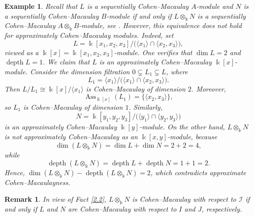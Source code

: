 \documentclass[10pt,a4paper]{amsart}
\numberwithin{equation}{theorem}
\theoremstyle{definition}
\theoremstyle{fact}
\newtheorem{example}[theorem]{Example}
\newtheorem{remark}[theorem]{Remark}
\theoremstyle{conjecture}
\newcommand{\Ass}{\operatorname{Ass}}
\newcommand{\depth}{\operatorname{depth}}
\begin{document}
\begin{example}
\label{4.5}
{\em
Recall that $L$ is a sequentially Cohen--Macaulay $A$-module and $N$ is a sequentially Cohen--Macaulay $B$-module
if and only if $L \otimes_\Bbbk N$ is a sequentially Cohen--Macaulay $A\otimes_\Bbbk B$-module, see \cite[Theorem 4.6]{R4}.
However, this equivalence does not hold for approximately Cohen--Macaulay modules.
Indeed, set
\[
L=\Bbbk[x_1, x_2, x_3]/\big(\langle x_1 \rangle \cap \langle x_2, x_3 \rangle\big),
\]
viewed as a $\Bbbk[x]=\Bbbk[x_1, x_2, x_3]$-module.
One verifies that $\dim L = 2$ and $\depth L = 1$.
We claim that $L$ is an approximately Cohen--Macaulay $\Bbbk[x]$-module.
Consider the dimension filtration $0 \subsetneq L_1 \subsetneq L$, where
\[
L_1 = \langle x_1 \rangle / \big(\langle x_1 \rangle \cap \langle x_2, x_3 \rangle\big).
\]
Then $L/L_1 \cong \Bbbk[x]/\langle x_1 \rangle$
is Cohen--Macaulay of dimension $2$. Moreover,
\[
\Ass_{\Bbbk[x]}(L_1) = \{\langle x_2, x_3 \rangle\},
\]
so $L_1$ is Cohen--Macaulay of dimension $1$.
Similarly,
\[
N=\Bbbk[y_1, y_2, y_3]/\big(\langle y_1 \rangle \cap \langle y_2, y_3 \rangle\big)
\]
is an approximately Cohen--Macaulay $\Bbbk[y]$-module.
On the other hand, $L \otimes_\Bbbk N$ is \emph{not} approximately Cohen--Macaulay as an $\Bbbk[x, y]$-module, because
\[
\dim (L \otimes_\Bbbk N) = \dim L + \dim N = 2+2=4,
\]
while
\[
\depth (L \otimes_\Bbbk N) = \depth L + \depth N = 1+1=2.
\]
Hence, $\dim (L \otimes_\Bbbk N) - \depth (L \otimes_\Bbbk N) = 2$,
which contradicts approximate Cohen--Macaulayness.
}
\end{example}
\begin{remark}{\em
\label{4.6}
 In view of Fact \ref{2.2}, $L\otimes_{\Bbbk} N$ is Cohen--Macaulay with respect to $\mathcal{I}$
 if and only if $L$ and $N$ are Cohen--Macaulay with respect to $I$ and $J$, respectively.}
\end{remark}
\end{document}
